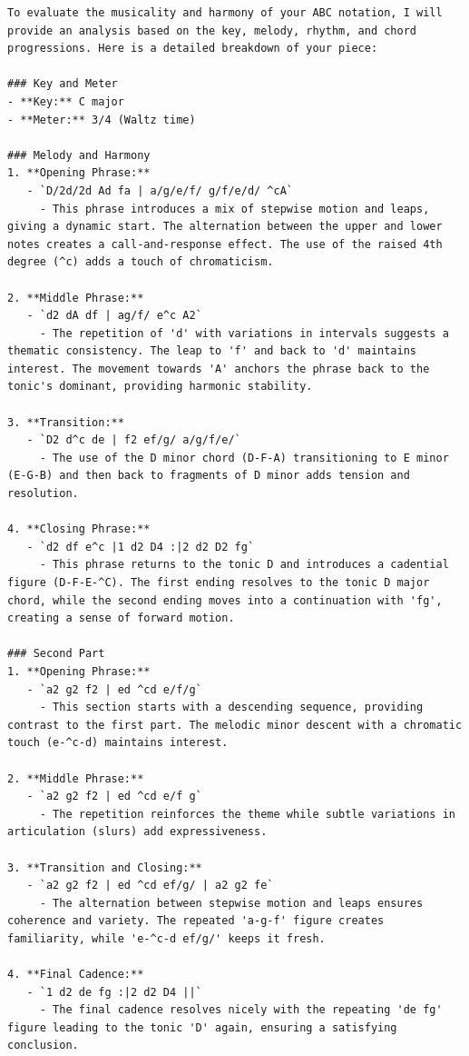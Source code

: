\documentclass[data-science]{agh-wi} %
\begin{document}
\begin{verbatim}
To evaluate the musicality and harmony of your ABC notation, I will provide an analysis based on the key, melody, rhythm, and chord progressions. Here is a detailed breakdown of your piece:

### Key and Meter
- **Key:** C major
- **Meter:** 3/4 (Waltz time)

### Melody and Harmony
1. **Opening Phrase:**
   - `D/2d/2d Ad fa | a/g/e/f/ g/f/e/d/ ^cA`
     - This phrase introduces a mix of stepwise motion and leaps, giving a dynamic start. The alternation between the upper and lower notes creates a call-and-response effect. The use of the raised 4th degree (^c) adds a touch of chromaticism.

2. **Middle Phrase:**
   - `d2 dA df | ag/f/ e^c A2`
     - The repetition of 'd' with variations in intervals suggests a thematic consistency. The leap to 'f' and back to 'd' maintains interest. The movement towards 'A' anchors the phrase back to the tonic's dominant, providing harmonic stability.

3. **Transition:**
   - `D2 d^c de | f2 ef/g/ a/g/f/e/`
     - The use of the D minor chord (D-F-A) transitioning to E minor (E-G-B) and then back to fragments of D minor adds tension and resolution.

4. **Closing Phrase:**
   - `d2 df e^c |1 d2 D4 :|2 d2 D2 fg`
     - This phrase returns to the tonic D and introduces a cadential figure (D-F-E-^C). The first ending resolves to the tonic D major chord, while the second ending moves into a continuation with 'fg', creating a sense of forward motion.

### Second Part
1. **Opening Phrase:**
   - `a2 g2 f2 | ed ^cd e/f/g`
     - This section starts with a descending sequence, providing contrast to the first part. The melodic minor descent with a chromatic touch (e-^c-d) maintains interest.

2. **Middle Phrase:**
   - `a2 g2 f2 | ed ^cd e/f g`
     - The repetition reinforces the theme while subtle variations in articulation (slurs) add expressiveness.

3. **Transition and Closing:**
   - `a2 g2 f2 | ed ^cd ef/g/ | a2 g2 fe`
     - The alternation between stepwise motion and leaps ensures coherence and variety. The repeated 'a-g-f' figure creates familiarity, while 'e-^c-d ef/g/' keeps it fresh.

4. **Final Cadence:**
   - `1 d2 de fg :|2 d2 D4 ||`
     - The final cadence resolves nicely with the repeating 'de fg' figure leading to the tonic 'D' again, ensuring a satisfying conclusion.


\end{verbatim}
\end{document}
